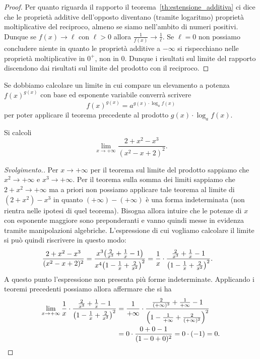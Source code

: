 \begin{proof}
Per quanto riguarda il rapporto il teorema~\ref{th:estensione_additiva}
ci dice che le proprietà additive dell'opposto diventano (tramite logaritmo)
proprietà moltiplicative del reciproco, almeno se siamo nell'ambito di numeri positivi.
Dunque se $f(x)\to \ell$ con $\ell>0$ 
allora $\frac{1}{f(x)} \to \frac{1}{\ell}$.
Se $\ell=0$ non possiamo concludere niente in quanto le proprietà 
additive a $-\infty$ si rispecchiano nelle proprietà moltiplicative 
in $0^+$, non in $0$. 
Dunque i risultati sul limite del rapporto discendono dai risultati 
sul limite del prodotto con il reciproco.
\end{proof}


Se dobbiamo calcolare un limite in cui compare un elevamento 
a potenza $f(x)^{g(x)}$ con base ed esponente variabile converrà 
scrivere
\[
 f(x)^{g(x)} = a^{g(x)\cdot \log_a f(x)}
\]
per poter applicare il teorema precedente al prodotto $g(x)\cdot \log_a f(x)$.

\begin{example}
  Si calcoli
  \[
  \lim_{x\to +\infty} \frac{2+x^2-x^3}{(x^2-x+2)^2}.
  \]
  \end{example}
  \begin{proof}[Svolgimento.]
  Per $x\to +\infty$ per il teorema sul limite del
  prodotto sappiamo che $x^2\to +\infty$ e
  $x^3\to +\infty$.
  Per il teorema sulla somma dei limiti
  sappiamo che $2+x^2\to +\infty$ ma
  a priori non possiamo applicare tale teorema
  al limite di $(2+x^2)-x^3$ in quanto
  $(+\infty)-(+\infty)$ è una forma indeterminata
  (non rientra nelle ipotesi di quel teorema).
  Bisogna allora intuire che le potenze di $x$
  con esponente maggiore sono preponderanti e vanno
  quindi messe in evidenza tramite
  manipolazioni algebriche. L'espressione
  di cui vogliamo calcolare il limite
  si può quindi riscrivere in questo modo:
  \begin{align*}
  \frac{2+x^2-x^3}{(x^2-x+2)^2}
  &= \frac{x^3 {\left( \frac 2 {x^3}+\frac{1}{x}-1 \right)}}{x^4{\left( 1-\frac 1 x + \frac{2}{x^2} \right)}^2}
  = \frac{1}{x}\cdot \frac{\frac 2 {x^3}+\frac{1}{x}-1}{{\left( 1-\frac 1 x + \frac{2}{x^2} \right)}^2}.
  \end{align*}
  A questo punto l'espressione non presenta più forme indeterminate.
  Applicando i teoremi precedenti possiamo allora affermare che
  si ha
  \begin{align*}
  \lim_{x\to+\infty}\frac{1}{x}\cdot \frac{\frac 2 {x^3}+\frac{1}{x}-1}{{\left( 1-\frac 1 x + \frac{2}{x^2} \right)}^2}
  &= \frac{1}{+\infty} \cdot \frac{\frac 2 {(+\infty)^3}+\frac{1}{+\infty}-1}{{\left( 1-\frac 1 {+\infty} + \frac{2}{(+\infty)^2} \right)}^2}\\
  &= 0 \cdot \frac{0+0-1}{(1-0+0)^2} = 0\cdot (-1) = 0.
  \end{align*}
\end{proof}


